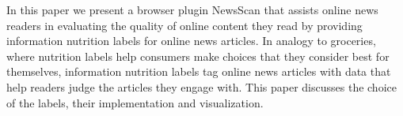 In this paper we present a browser plugin NewsScan that assists online news readers in evaluating the quality of online content they read by providing information nutrition labels for online news articles. In analogy to groceries, where nutrition labels help consumers make choices that they consider best for themselves, information nutrition labels tag online news articles with data that help readers judge the articles they engage with. This paper discusses the choice of the labels, their implementation and visualization.
